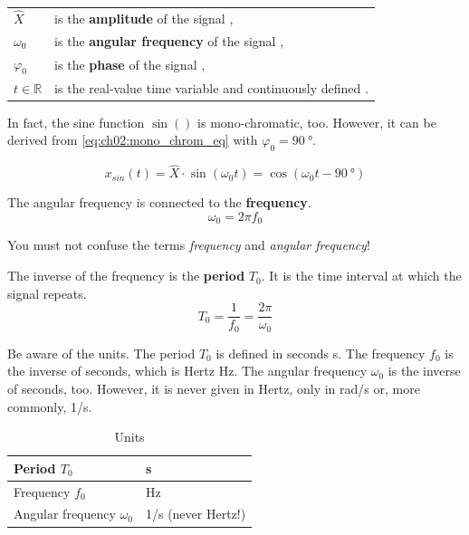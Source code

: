 \begin{refsection}
\begin{tabular}{ll}
	$\hat{X}$ & is the \index{amplitude} \textbf{amplitude} of the signal \nomenclature[Sx]{$\hat{X}$}{Amplitude of a mono-chromatic signal}, \\
	$\omega_0$ & is the \index{angular frequency} \textbf{angular frequency} of the signal \nomenclature[So]{$\omega_0$}{Angular frequency of a mono-chromatic signal}, \\
	$\varphi_0$ & is the \index{phase} \textbf{phase} of the signal \nomenclature[Sp]{$\varphi_0$}{Phase of a mono-chromatic signal}, \\
	$t \in \mathbb{R}$ & is the real-value time variable and continuously defined \nomenclature[St]{$t$}{Time (continuous)}.
\end{tabular}

In fact, the sine function $\sin()$ is mono-chromatic, too. However, it can be derived from \eqref{eq:ch02:mono_chrom_eq} with $\varphi_0 = \SI{90}{\degree}$.

\begin{equation*}
	x_{sin}(t) = \hat{X} \cdot \sin\left(\omega_0 t\right) = \cos\left(\omega_0 t - \SI{90}{\degree}\right)
\end{equation*}

The angular frequency is connected to the  \textbf{frequency}.
\begin{equation}
	\omega_0 = 2 \pi f_0
\end{equation}%

\begin{attention}
	You must not confuse the terms \emph{frequency} and \emph{angular frequency}!
\end{attention}

The inverse of the frequency is the  \textbf{period} $T_0$. It is the time interval at which the signal repeats.
\begin{equation}
	T_0 = \frac{1}{f_0} = \frac{2 \pi}{\omega_0}
\end{equation}%

Be aware of the units. The period $T_0$ is defined in seconds \si{s}. The frequency $f_0$ is the inverse of seconds, which is Hertz \si{Hz}. The angular frequency $\omega_0$ is the inverse of seconds, too. However, it is never given in Hertz, only in \si{rad/s} or, more commonly, \si{1/s}.

\begin{table}[H]
	\centering
	\caption{Units}
	\begin{tabular}{|l|l|}
		\hline
		Period $T_0$ & \si{s} \\
		\hline
		Frequency $f_0$ & \si{Hz} \\
		\hline
		Angular frequency $\omega_0$ & \si{1/s} \; (never Hertz!) \\
		\hline
	\end{tabular}
\end{table}


\end{refsection}
